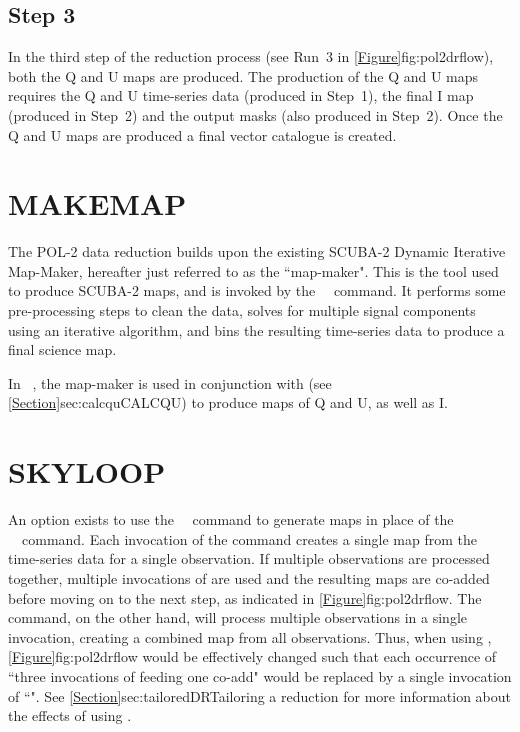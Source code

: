 \subsection*{Step 3}

In the third step of the reduction process (see Run~3 in
\cref{Figure}{fig:pol2drflow}{}), both the Q and U maps are produced. The production
of the Q and U maps requires the Q and U time-series data (produced in
Step~1), the final I map (produced in Step~2) and the output masks (also
produced in Step~2). Once the Q and U maps are produced a final vector
catalogue is created.

\section{MAKEMAP}

The POL-2 data reduction builds upon the existing SCUBA-2 Dynamic
Iterative Map-Maker, hereafter just referred to as the ``map-maker". This
is the tool used to produce SCUBA-2 maps, and is invoked by the
\SMURF\ \makemap\ command. It performs some
pre-processing steps to clean the data, solves for multiple signal
components using an iterative algorithm, and bins the resulting
time-series data to produce a final science map.

In \poltwomap\ , the map-maker is used in conjunction with
 (see
\cref{Section}{sec:calcqu}{CALCQU}) to produce maps of Q and U, as well as I.

\section{SKYLOOP}
\label{sec:skyloop}

An option exists to use the \SMURF\ \skyloop\  command to generate maps
in place of the \SMURF\ \makemap\ command. Each invocation of the
 command creates a single map from the time-series data
for a single observation. If multiple observations are processed together,
multiple invocations of  are used and the resulting maps are
co-added before moving on to the next step, as indicated in
\cref{Figure}{fig:pol2drflow}{}. The  command, on the other hand,
will process multiple observations in a single invocation, creating a combined
map from all observations. Thus, when using ,
\cref{Figure}{fig:pol2drflow}{} would be effectively changed such that each occurrence
of ``three invocations of  feeding one co-add" would be replaced
by a single invocation of ``". See
\cref{Section}{sec:tailoredDR}{Tailoring a reduction}
for more information about the effects of using .

